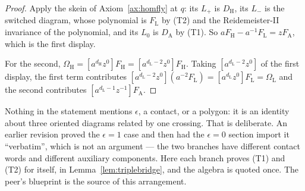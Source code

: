 \begin{proof}
Apply the skein of Axiom~\ref{ax:homfly} at $q$: its $L_+$ is $D_{\mathrm H}$,
its $L_-$ is the switched diagram, whose polynomial is $F_{\mathrm L}$ by (T2)
and the Reidemeister-II invariance of the polynomial, and its $L_0$ is
$D_{\mathrm A}$ by (T1). So $aF_{\mathrm H}-a^{-1}F_{\mathrm L}=zF_{\mathrm A}$,
which is the first display.

For the second, $\Omega_{\mathrm H}=[a^{d_{\mathrm H}}z^0]F_{\mathrm H}
=[a^{d_{\mathrm L}-2}z^0]F_{\mathrm H}$. Taking $[a^{d_{\mathrm L}-2}z^0]$ of
the first display, the first term contributes
$[a^{d_{\mathrm L}-2}z^0](a^{-2}F_{\mathrm L})
=[a^{d_{\mathrm L}}z^0]F_{\mathrm L}=\Omega_{\mathrm L}$ and the second
contributes $[a^{d_{\mathrm L}-1}z^{-1}]F_{\mathrm A}$.
\end{proof}

\begin{remark}\label{rem:branchneutral}
Nothing in the statement mentions $\epsilon$, a contact, or a polygon: it is an
identity about three oriented diagrams related by one crossing. That is
deliberate. An earlier revision proved the $\epsilon=1$ case and then had the
$\epsilon=0$ section import it ``verbatim'', which is not an argument --- the
two branches have different contact words and different auxiliary components.
Here each branch proves (T1) and (T2) for itself, in
Lemma~\ref{lem:triplebridge}, and the algebra is quoted once. The peer's
blueprint is the source of this arrangement.
\end{remark}

